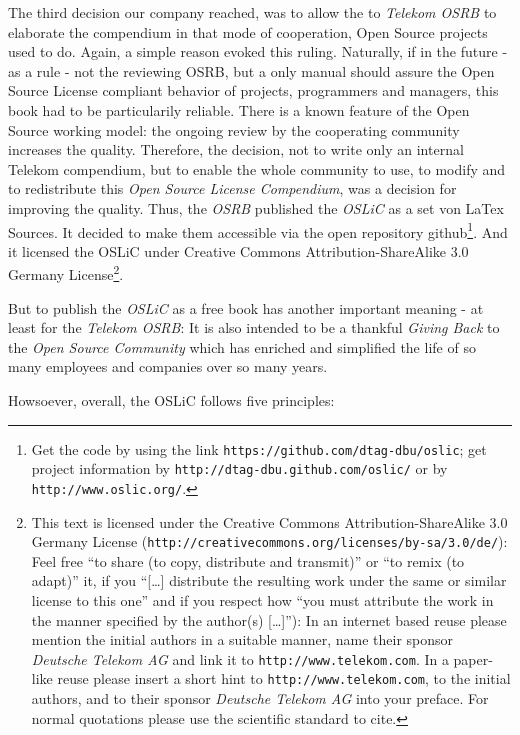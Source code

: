 The third decision our company reached, was to allow the to \emph{Telekom OSRB}
to elaborate the compendium in that mode of cooperation, Open Source projects
used to do. Again, a simple reason evoked this ruling. Naturally, if in the
future - as a rule - not the reviewing OSRB, but a only manual should assure the
Open Source License compliant behavior of projects, programmers and managers,
this book had to be particularily reliable. There is a known feature of the Open
Source working model: the ongoing review by the cooperating community increases
the quality. Therefore, the decision, not to write only an internal Telekom
compendium, but to enable the whole community to use, to modify and to
redistribute this \emph{Open Source License Compendium}, was a decision for
improving the quality. Thus, the \emph{OSRB} published the \emph{OSLiC} as a set
von LaTex Sources. It decided to make them accessible via the open repository
github\footnote{Get the code by using the link
\texttt{https://github.com/dtag-dbu/oslic}; get project information by
\texttt{http://dtag-dbu.github.com/oslic/} or by
\texttt{http://www.oslic.org/}.}. And it licensed the OSLiC under Creative
Commons Attribution-ShareAlike 3.0 Germany License\footnote{ This text is
licensed under the Creative Commons Attribution-ShareAlike 3.0 Germany License
(\texttt{http://creativecommons.org/licenses/by-sa/3.0/de/}): Feel free
\enquote{to share (to copy, distribute and transmit)} or \enquote{to remix (to
adapt)} it, if you \enquote{[\ldots] distribute the resulting work under the
same or similar license to this one} and if you respect how \enquote{you must
attribute the work in the manner specified by the author(s) [\ldots]}):
In an internet based reuse please mention the initial authors in a suitable
manner, name their sponsor \textit{Deutsche Telekom AG} and link it to
\texttt{http://www.telekom.com}. In a paper-like reuse please insert a short
hint to \texttt{http://www.telekom.com}, to the initial authors, and to their
sponsor \textit{Deutsche Telekom AG} into your preface. For normal quotations
please use the scientific standard to cite.}.

But to publish the \emph{OSLiC} as a free book has another important meaning -
at least for the \emph{Telekom OSRB}: It is also intended to be a thankful
\emph{Giving Back} to the \emph{Open Source Community} which has enriched and
simplified the life of so many employees and companies over so many years.

Howsoever, overall, the OSLiC follows five principles:

